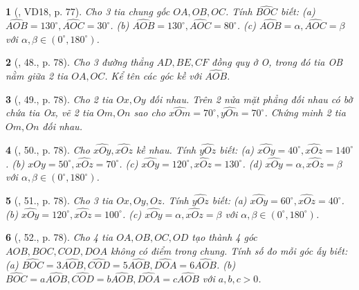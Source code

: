 \documentclass{article}
\newtheorem{baitoan}{}
\begin{document}
\begin{baitoan}[\cite{Binh_Toan_6_tap_2}, VD18, p. 77]
	Cho 3 tia chung gốc $OA,OB,OC$. Tính $\widehat{BOC}$ biết: (a) $\widehat{AOB} = 130^\circ,\widehat{AOC} = 30^\circ$. (b) $\widehat{AOB} = 130^\circ,\widehat{AOC} = 80^\circ$. (c) $\widehat{AOB} = \alpha,\widehat{AOC} = \beta$ với $\alpha,\beta\in(0^\circ,180^\circ)$.
\end{baitoan}

\begin{baitoan}[\cite{Binh_Toan_6_tap_2}, 48., p. 78]
	Cho 3 đường thẳng $AD,BE,CF$ đồng quy ở O, trong đó tia OB nằm giữa 2 tia $OA,OC$. Kể tên các góc kề với $\widehat{AOB}$.
\end{baitoan}

\begin{baitoan}[\cite{Binh_Toan_6_tap_2}, 49., p. 78]
	Cho 2 tia $Ox,Oy$ đối nhau. Trên 2 nửa mặt phẳng đối nhau có bờ chứa tia Ox, vẽ 2 tia $Om,On$ sao cho $\widehat{xOm} = 70^\circ,\widehat{yOn} = 70^\circ$. Chứng minh 2 tia $Om,On$ đối nhau.
\end{baitoan}

\begin{baitoan}[\cite{Binh_Toan_6_tap_2}, 50., p. 78]
	Cho $\widehat{xOy},\widehat{xOz}$ kề nhau. Tính $\widehat{yOz}$ biết: (a) $\widehat{xOy} = 40^\circ,\widehat{xOz} = 140^\circ$. (b) $\widehat{xOy} = 50^\circ,\widehat{xOz} = 70^\circ$. (c) $\widehat{xOy} = 120^\circ,\widehat{xOz} = 130^\circ$. (d) $\widehat{xOy} = \alpha,\widehat{xOz} = \beta$ với $\alpha,\beta\in(0^\circ,180^\circ)$.
\end{baitoan}

\begin{baitoan}[\cite{Binh_Toan_6_tap_2}, 51., p. 78]
	Cho 3 tia $Ox,Oy,Oz$. Tính $\widehat{yOz}$ biết: (a) $\widehat{xOy} = 60^\circ,\widehat{xOz} = 40^\circ$. (b) $\widehat{xOy} = 120^\circ,\widehat{xOz} = 100^\circ$. (c) $\widehat{xOy} = \alpha,\widehat{xOz} = \beta$ với $\alpha,\beta\in(0^\circ,180^\circ)$.
\end{baitoan}

\begin{baitoan}[\cite{Binh_Toan_6_tap_2}, 52., p. 78]
	Cho 4 tia $OA,OB,OC,OD$ tạo thành 4 góc $AOB,BOC,COD,DOA$ không có điểm trong chung. Tính số đo mỗi góc ấy biết: (a) $\widehat{BOC} = 3\widehat{AOB},\widehat{COD} = 5\widehat{AOB},\widehat{DOA} = 6\widehat{AOB}$. (b) $\widehat{BOC} = a\widehat{AOB},\widehat{COD} = b\widehat{AOB},\widehat{DOA} = c\widehat{AOB}$ với $a,b,c > 0$.
\end{baitoan}
\end{document}
